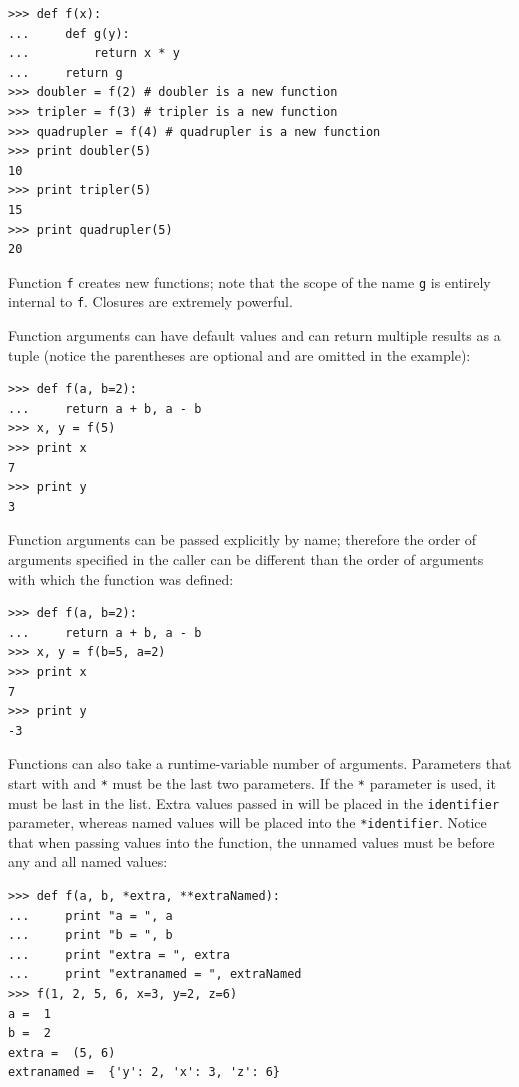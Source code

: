 \documentclass[justified,sixbynine]{tufte-book}
\def\ft{\small\tt}
\theoremstyle{plain}%
\theoremstyle{definition}
\theoremstyle{remark}
\begin{document}
\begin{fullwidth}

\begin{lstlisting}
>>> def f(x):
...     def g(y):
...         return x * y
...     return g
>>> doubler = f(2) # doubler is a new function
>>> tripler = f(3) # tripler is a new function
>>> quadrupler = f(4) # quadrupler is a new function
>>> print doubler(5)
10
>>> print tripler(5)
15
>>> print quadrupler(5)
20
\end{lstlisting}

Function {\ft f} creates new functions; note that the scope of the name {\ft g} is entirely internal to {\ft f}.  Closures are extremely powerful.

Function arguments can have default values and can return multiple results as a tuple (notice the parentheses are optional and are omitted in the example):

\begin{lstlisting}
>>> def f(a, b=2):
...     return a + b, a - b
>>> x, y = f(5)
>>> print x
7
>>> print y
3
\end{lstlisting}

Function arguments can be passed explicitly by name; therefore the order of arguments specified in the caller can be different than the order of arguments with which the function was defined:

\begin{lstlisting}
>>> def f(a, b=2):
...     return a + b, a - b
>>> x, y = f(b=5, a=2)
>>> print x
7
>>> print y
-3
\end{lstlisting}

Functions can also take a runtime-variable number of arguments.  Parameters that start with {\ft *} and {\ft **} must be the last two parameters.  If the {\ft **} parameter is used, it must be last in the list.  Extra values passed in will be placed in the {\ft *identifier} parameter, whereas named values will be placed into the {\ft **identifier}.  Notice that when passing values into the function, the unnamed values must be before any and all named values:

\begin{lstlisting}
>>> def f(a, b, *extra, **extraNamed):
...     print "a = ", a
...     print "b = ", b
...     print "extra = ", extra
...     print "extranamed = ", extraNamed
>>> f(1, 2, 5, 6, x=3, y=2, z=6)
a =  1
b =  2
extra =  (5, 6)
extranamed =  {'y': 2, 'x': 3, 'z': 6}
\end{lstlisting}


\end{fullwidth}
\end{document}
